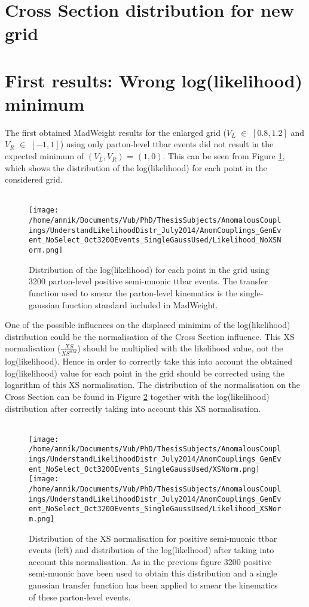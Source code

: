 \newpage
\section{Cross Section distribution for new grid}

\section{First results: Wrong log(likelihood) minimum}

The first obtained MadWeight results for the enlarged grid ($V_L$ $\in$ $[0.8,1.2]$ and $V_R$ $\in$ $[-1,1]$) using only parton-level ttbar events did not result in the expected minimum of $(V_L,V_R)$ = $(1, 0)$. This can be seen from Figure \ref{fig::Likelihood}, which shows the distribution of the log(likelihood) for each point in the considered grid.\\ \\
\begin{figure}[!h]
 \centering
 \texttt{[image: /home/annik/Documents/Vub/PhD/ThesisSubjects/AnomalousCouplings/UnderstandLikelihoodDistr\_July2014/AnomCouplings\_GenEvent\_NoSelect\_Oct3200Events\_SingleGaussUsed/Likelihood\_NoXSNorm.png]}
 \caption{Distribution of the log(likelihood) for each point in the grid using 3200 parton-level positive semi-muonic ttbar events. The transfer function used to smear the parton-level kinematics is the single-gaussian function standard included in MadWeight.}
 \label{fig::Likelihood}
\end{figure}
One of the possible influences on the displaced minimim of the log(likelihood) distribution could be the normalisation of the Cross Section influence. This XS normalisation ($\frac{XS}{XS^{SM}}$) should be multiplied with the likelihood value, not the log(likelihood). Hence in order to correctly take this into account the obtained log(likelihood) value for each point in the grid should be corrected using the logarithm of this XS normalisation. The distribution of the normalisation on the Cross Section can be found in Figure \ref{fig::XSandLikelihoodNorm} together with the log(likelihood) distribution after correctly taking into account this XS normalisation.\\ \\
\begin{figure}[!h]
 \texttt{[image: /home/annik/Documents/Vub/PhD/ThesisSubjects/AnomalousCouplings/UnderstandLikelihoodDistr\_July2014/AnomCouplings\_GenEvent\_NoSelect\_Oct3200Events\_SingleGaussUsed/XSNorm.png]}
 \texttt{[image: /home/annik/Documents/Vub/PhD/ThesisSubjects/AnomalousCouplings/UnderstandLikelihoodDistr\_July2014/AnomCouplings\_GenEvent\_NoSelect\_Oct3200Events\_SingleGaussUsed/Likelihood\_XSNorm.png]}
 \caption{Distribution of the XS normalisation for positive semi-muonic ttbar events (left) and distribution of the log(likelhood) after taking into account this normalisation. As in the previous figure 3200 positive semi-muonic have been used to obtain this distribution and a single gaussian transfer function has been applied to smear the kinematics of these parton-level events.}
 \label{fig::XSandLikelihoodNorm}
\end{figure}
